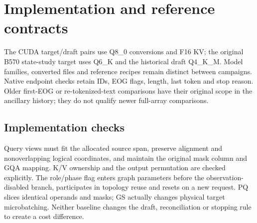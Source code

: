 \section{Implementation and reference contracts}
\label{supp:implementation}\label{supp:contracts}
The CUDA target/draft pairs use Q8\_0 conversions and F16 KV; the original B570 state-study target uses Q6\_K and the historical draft Q4\_K\_M. Model families, converted files and reference recipes remain distinct between campaigns. Native endpoint checks retain IDs, EOG flags, length, last token and stop reason. Older first-EOG or re-tokenized-text comparisons have their original scope in the ancillary history; they do not qualify newer full-array comparisons.

\subsection{Implementation checks}
Query views must fit the allocated source span, preserve alignment and nonoverlapping logical coordinates, and maintain the original mask column and GQA mapping. K/V ownership and the output permutation are checked explicitly. The role/phase flag enters graph parameters before the observation-disabled branch, participates in topology reuse and resets on a new request. PQ slices identical operands and masks; GS actually changes physical target microbatching. Neither baseline changes the draft, reconciliation or stopping rule to create a cost difference.

